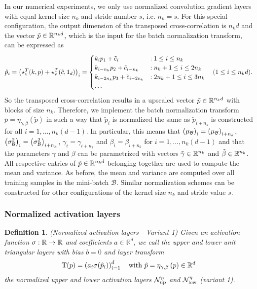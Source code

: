 \documentclass[twoside,a4paper]{article}
\newtheorem{definition}{Definition}
\begin{document}
In our numerical experiments, we only use normalized convolution gradient layers with equal 
kernel size $n_k$ and stride number $s$, i.e. $n_k = s$. For this special configuration,
the output dimension of the transposed cross-correlation is $n_k d$ and
the vector $\tilde{p} \in \mathbb{R}^{n_k d}$, which is the input for the
batch normalization transform, can be expressed as
\begin{equation*}
	\tilde{p}_i = \left( \star_{\text{v}}^T(k,p) + \star_{\text{v}}^T(\tilde{c},1_d) \right)_i 
	= \begin{cases}
		k_i p_1 + \tilde{c}_i &: 1 \leq i \leq n_k \\
		k_{i - n_k} p_2 + \tilde{c}_{i - n_k} &: n_k+1 \leq i \leq 2n_k \\
		k_{i - 2n_k} p_3 + \tilde{c}_{i - 2n_k} &: 2n_k+1 \leq i \leq 3n_k \\
		\dots
	\end{cases} \quad (1 \leq i \leq n_k d)
	.
\end{equation*}
So the transposed cross-correlation results in a upscaled vector $\tilde{p} \in \mathbb{R}^{n_k d}$ with blocks of size $n_k$.
Therefore, we implement the batch normalization transform 
$\overline{p} = \eta_{\gamma, \beta}(\tilde{p})$ in such a way that $\tilde{p}_i$ is
normalized the same as $\tilde{p}_{i+n_k}$ is constructed for all $i = 1, \dots, n_k (d-1)$. 
In particular, this means that
$\left( \mu_\mathcal{B} \right)_i = \left( \mu_\mathcal{B} \right)_{i+n_k}$, 
$\left( \sigma^2_\mathcal{B} \right)_i = \left( \sigma^2_\mathcal{B} \right)_{i+n_k}$, 
$\gamma_i = \gamma_{i+n_k}$ and $\beta_i = \beta_{i+n_k}$ for $i = 1, \dots, n_k (d-1)$
and that the parameters $\gamma$ and $\beta$ can be parametrized with vectors
$\tilde{\gamma} \in \mathbb{R}^{n_k}$ and $\tilde{\beta} \in \mathbb{R}^{n_k}$. All respective entries of $\tilde{p} \in \mathbb{R}^{n_k d}$ 
belonging together are used to compute the mean and variance.
As before, the mean and variance are computed over all training samples in the mini-batch $\mathcal{B}$.
Similar normalization schemes can be constructed for other configurations of the 
kernel size $n_k$ and stride value $s$.

\subsubsection{Normalized activation layers}

\begin{definition}\label{def_norm_activation_layer_1}
	(Normalized activation layers - Variant 1)
	Given an activation function $\sigma : \mathbb{R} \to \mathbb{R}$ and coefficients $a \in \mathbb{R}^d$, 
	we call the upper and lower unit triangular layers with bias $b=0$ and layer transform
	\begin{equation*}
		\mathrm{T}(p) = \left( a_i \sigma(\hat{p}_i) \right)_{i=1}^d
		\quad \text{with } \hat{p} = \eta_{\gamma, \beta} \left( p \right) \in \mathbb{R}^d
	\end{equation*}
	the normalized upper and lower activation layers $\mathcal{N}_{\text{up}}^\eta$ and $\mathcal{N}_{\text{low}}^\eta$
	(variant 1).
\end{definition}
\end{document}
